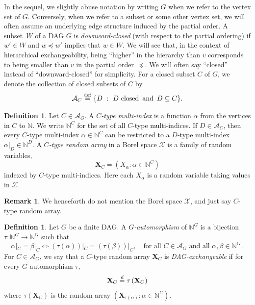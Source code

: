 \documentclass[10pt]{amsart}
\theoremstyle{definition}\newtheorem{defi}[theo]{Definition}\newtheorem{rema}[theo]{Remark}\newtheorem{exam}[theo]{Example}\newtheorem{exem}[theo]{Example}\newtheorem{nota}[theo]{Notation}
\newcommand{\alf}{\alpha}%
\newcommand*\bb{\beta}
\newcommand*{\defeq}{\stackrel{\mathrm{def}}{=}}
\newcommand{\indices}[1]{\mathbb{N}^{#1}}
\newcommand{\res}[2]{#1|_{#2}}
\renewcommand{\d}{\buildrel{d}\over{=}}
\newcommand*\N{\mathbb{N}}
\renewcommand{\AA}{\mathcal{A}}
\newcommand*\XX{{\mathcal{X}}}
\newcommand*\bX{\mathbf{X}}
\begin{document}
In the sequel, we slightly abuse notation by writing $G$ when we refer to the vertex set of $G$. Conversely, when we refer to a subset or some other vertex set, we will often assume an underlying edge structure induced by the partial order. A subset~$W$ of a DAG $G$ is \emph{downward-closed} (with respect to the partial ordering) if $w'\in W$ and $w\preceq w'$ implies that $w\in W$. We will see that, in the context of hierarchical exchangeability, being ``higher'' in the hierarchy than $v$ corresponds to being smaller than $v$ in the partial order $\preceq$. We will often say ``closed'' instead of ``downward-closed'' for simplicity. For a closed subset $C$ of $G$, we denote the collection of closed subsets of $C$ by
\[
\AA_C
\defeq \{D~:~D \text{ closed\, and\, }D \subseteq C\}.
\]

\begin{defi}\label{def:randomarray}
Let $C\in\AA_G$. A \emph{$C$-type multi-index} is a function $\alf$ from the vertices in $C$ to $\mathbb{N}$. We write $\N^C$ for the set of all $C$-type multi-indices. If $D\in\AA_C$, then every $C$-type multi-index $\alf\in\N^{C}$ can be restricted to a $D$-type multi-index $\alf|_{D}\in \N^{D}$.
A \emph{$C$-type random array} in a Borel space $\XX$ is a family of random variables,
\[
\bX_C = \left(X_{\alf} : \alf \in \indices C\right)
\]
indexed by $C$-type multi-indices. Here each $X_\alf$ is a random variable taking values in $\XX$.
\end{defi}


\begin{rema}
We henceforth do not mention the Borel space $\XX$, and just say $C$-type random array.
\end{rema}

\begin{defi}\label{def: G-auto}
Let $G$ be a finite DAG. A \emph{$G$-automorphism} of $\N^G$ is a bijection $\tau\colon \N^G\to\N^G$ such that
\begin{equation}\label{eqn: automorphism}
\res \alf C = \res \bb C \Longleftrightarrow \res{(\tau(\alf))}C = \res {(\tau (\bb))} C,\quad
\text{for all }C\in\AA_G\text{ and all }\alf,\bb \in \N^G\,.
\end{equation}
For $C\in\AA_G$, we say that a $C$-type random array $\bX_C$ is \emph{DAG-exchangeable} if for every $G$-automorphism $\tau$,
\[
\bX_C\d \tau\left(\bX_C\right)
\]
where $\tau(\bX_C)$ is the random array $\left(\bX_{\tau(\alpha)} : \alpha \in \mathbb{N}^C\right)$.
\end{defi}
\end{document}
